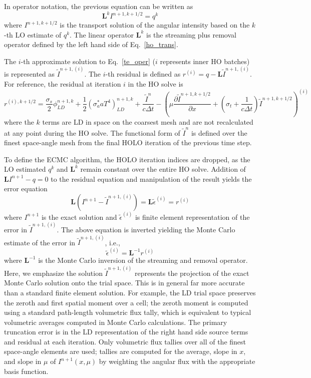 \documentclass{mc2013}
\newcommand{\pderiv}[2]{\frac{\partial #1}{\partial #2}}
\newcommand{\B}[1]{\ensuremath{\mathbf{#1}}}
\begin{document}
 In operator notation, the previous equation can be written as
\begin{equation}\label{te_oper}
\B L^k I^{n+1,k+1/2}  = q^{k}
\end{equation}
where $I^{n+1,k+1/2}$ is the transport solution of the angular intensity based on the
$k$-th LO estimate of $q^k$.
The linear operator $\B L^k$ is the streaming plus
removal operator defined by the left hand
side of Eq.~\eqref{ho_trans}.

The $i$-th approximate solution to Eq.~\eqref{te_oper} ($i$ represents inner HO
batches) is represented as
$\tilde{I}^{n+1,(i)}$.    
The $i$-th residual is defined as $r^{(i)} = q - \B L\tilde{I}^{n+1,(i)}.$ 
For reference, the residual at iteration $i$ in the HO solve
is
\begin{equation}
r^{(i),k+1/2} = \frac{\sigma_s}{2} \phi_{LD}^{n+1,k} +\frac{1}{2} \left(\sigma_a^* a T^4
\right)_{LD}^{n+1,k} + \frac{\tilde{I}^n}{c \Delta t } -
\left(\mu \pderiv{\tilde{I}^{n+1,k+1/2}}{x} +
\left(\sigma_t + \frac{1}{c \Delta t }\right) \tilde{I}^{n+1,k+1/2}\right)^{(i)}
\end{equation}
where the $k$ terms are LD in space on the coarsest mesh and are not recalculated at any point during
the HO solve.  The functional form of $\tilde{I}^n$ is defined over the finest
space-angle mesh from the final HOLO iteration of the previous time step.  

To define the ECMC algorithm, the HOLO iteration indices
are dropped, as the LO estimated $q^{k}$ and $\B L^{k}$ remain constant over the entire HO solve.
Addition of $\B L I^{n+1} - q=0$ to the residual equation 
and manipulation of the result yields the error equation
\begin{equation}
    \B L (I^{n+1} - \tilde{I}^{n+1,(i)}) = \B L \tilde{\epsilon}^{(i)} = r^{(i)}
\end{equation}
where $I^{n+1}$ is the exact solution and $\tilde{\epsilon}^{(i)}$ is finite element
representation of the error in
$\tilde{I}^{n+1,(i)}$. The above equation is inverted yielding the Monte Carlo
estimate of the error in $\tilde{I}^{n+1,(i)}$, i.e.,
\begin{equation}
\tilde{\epsilon}^{(i)} = \B L^{-1} r^{(i)}
\end{equation}
where $\B L^{-1}$ is the Monte Carlo inversion of the streaming and removal operator.
Here, we emphasize the solution $\tilde{I}^{n+1,(i)}$ represents the projection of the exact Monte Carlo
solution onto the trial space.  This is in general far more accurate than a standard finite element solution.
For example, the LD trial space preserves the zeroth and first spatial moment over a
cell; the zeroth moment is computed using a standard path-length volumetric flux tally, which
is equivalent to typical volumetric averages computed in Monte Carlo calculations.  The primary truncation error is in the LD
representation of the right hand side source terms and residual at each
iteration.  Only volumetric flux tallies over all of the finest space-angle
elements are used; tallies are computed for the average, slope in $x$, and slope in $\mu$ of
$I^{n+1}(x,\mu)$ by weighting the angular flux with the appropriate basis function.
  
\end{document}
